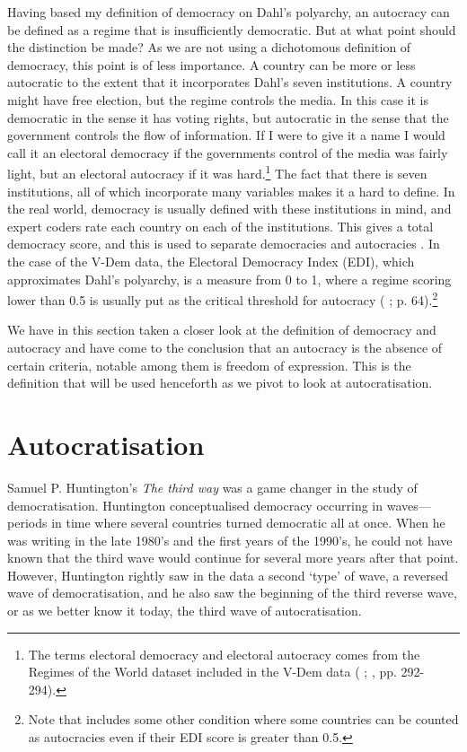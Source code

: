 Having based my definition of democracy on Dahl's polyarchy, an autocracy can be defined as a regime that is insufficiently democratic. But at what point should the distinction be made? As we are not using a dichotomous definition of democracy, this point is of less importance. A country can be more or less autocratic to the extent that it incorporates Dahl's seven institutions. A country might have free election, but the regime controls the media. In this case it is democratic in the sense it has voting rights, but autocratic in the sense that the government controls the flow of information. If I were to give it a name I would call it an electoral democracy if the governments control of the media was fairly light, but an electoral autocracy if it was hard.\footnote{The terms electoral democracy and electoral autocracy comes from the Regimes of the World dataset included in the V-Dem data (\citeauthor{coppedge_v-dem_2025} \citeyear{coppedge_v-dem_2025}; \citeauthor{coppedge_v-dem_2024-1} \citeyear{coppedge_v-dem_2024-1}, pp. 292-294).} The fact that there is seven institutions, all of which incorporate many variables makes it a hard to define. In the real world, democracy is usually defined with these institutions in mind, and expert coders rate each country on each of the institutions. This gives a total democracy score, and this is used to separate democracies and autocracies \citep{economist_intelligence_unit_democracy_2024, marshall_polity5_2020, coppedge_v-dem_2024-1}. In the case of the V-Dem data, the Electoral Democracy Index (EDI), which approximates Dahl's polyarchy, is a measure from 0 to 1, where a regime scoring lower than 0.5 is usually put as the critical threshold for autocracy (\citeauthor{lindberg_ordinal_2016} \citeyear{lindberg_ordinal_2016}; \citeauthor{luhrmann_regimes_2018} \citeyear{luhrmann_regimes_2018} p. 64).\footnote{Note that \citet{luhrmann_regimes_2018} includes some other condition where some countries can be counted as autocracies even if their EDI score is greater than 0.5.}

We have in this section taken a closer look at the definition of democracy and autocracy and have come to the conclusion that an autocracy is the absence of certain criteria, notable among them is freedom of expression. This is the definition that will be used henceforth as we pivot to look at autocratisation. 

\section{Autocratisation}
Samuel P. Huntington's \textit{The third way} \citeyearpar{huntington_third_1991} was a game changer in the study of democratisation. Huntington conceptualised democracy occurring in waves---periods in time where several countries turned democratic all at once. When he was writing in the late 1980's and the first years of the 1990's, he could not have known that the third wave would continue for several more years after that point. However, Huntington rightly saw in the data a second `type' of wave, a reversed wave of democratisation, and he also saw the beginning of the third  reverse wave, or as we better know it today, the third wave of autocratisation.

